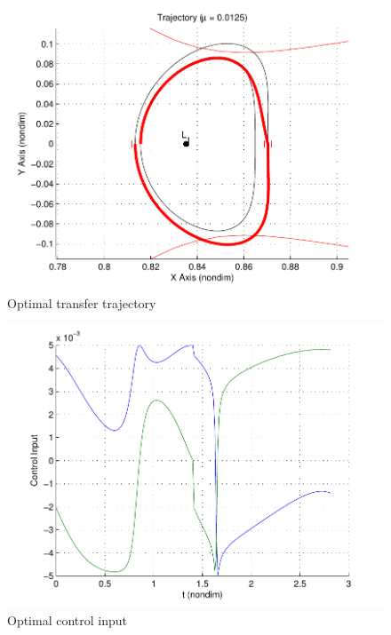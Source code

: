 \begin{figure}[!htbp]
	\includegraphics[width=0.5\textheight]{figures/2015_SSPI/opt_reach_trajectory}
	\caption{Optimal transfer trajectory}
	\label{fig:opt_reach_trajectory}
\end{figure}
\begin{figure}[!htbp]
	\includegraphics[width=0.5\textheight]{figures/2015_SSPI/opt_reach_control}
	\caption{Optimal control input}
	\label{fig:opt_reach_control}
\end{figure}
